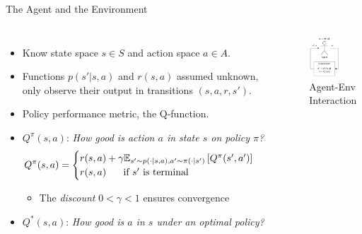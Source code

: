 \documentclass[aspectratio=1609,handout]{beamer}
\begin{document}
\begin{frame}{The Agent and the Environment}
  \begin{columns}
      \begin{itemize}
      \setlength\itemsep{2mm}
      \item<1-> Know state space $s \in S$ and action space $a \in A$.
      \item<2-> Functions $p(s'|s,a)$ and $r(s,a)$ assumed unknown, only observe
            their output in transitions $(s, a, r, s')$.
      \item<3-> Policy performance metric, the Q-function.
      \item<4-> $Q^\pi(s,a)$: \emph{How good is action $a$ in state $s$ on policy $\pi$?}
            \[
            Q^\pi(s,a) = \begin{cases}
            r(s,a) + \gamma \mathbb{E}_{s' \sim p(\cdot|s,a), a' \sim \pi(\cdot|s')} \left[
                Q^\pi(s',a')
            \right]
            \\
            r(s,a) \text{\hspace{5mm} if } s' \text{ is terminal}
            \end{cases}
            \]
            \begin{itemize}
            \item The \emph{discount} $0 < \gamma < 1$ ensures convergence
            \end{itemize}

      \item<5-> $Q^*(s,a)$: \emph{How good is $a$ in $s$ under an optimal policy?}
      \end{itemize}
      \begin{figure}
        \includegraphics[width=0.65\textwidth]{img/agent-env.pdf}
        \caption{Agent-Env Interaction}
      \end{figure}
  \end{columns}
\end{frame}
\end{document}
